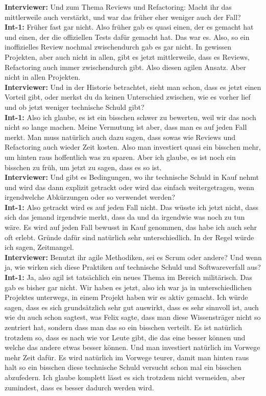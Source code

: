 \textbf{Interviewer:} Und zum Thema Reviews und Refactoring: Macht ihr das mittlerweile auch verstärkt, und war das früher eher weniger auch der Fall?\\
\textbf{Int-1:} Früher fast gar nicht. Also früher gab es quasi einen, der es gemacht hat und einen, der die offiziellen Tests dafür gemacht hat. Das war es. Also, so ein inoffizielles Review nochmal zwischendurch gab es gar nicht. In gewissen Projekten, aber auch nicht in allen, gibt es jetzt mittlerweile, dass es Reviews, Refactoring auch immer zwischendurch gibt. Also diesen agilen Ansatz. Aber nicht in allen Projekten.\\
\textbf{Interviewer:} Und in der Historie betrachtet, sieht man schon, dass es jetzt einen Vorteil gibt, oder merkst du da keinen Unterschied zwischen, wie es vorher lief und ob jetzt weniger technische Schuld gibt?\\
\textbf{Int-1:} Also ich glaube, es ist ein bisschen schwer zu bewerten, weil wir das noch nicht so lange machen. Meine Vermutung ist aber, dass man es auf jeden Fall merkt. Man muss natürlich auch dazu sagen, dass sowas wie Reviews und Refactoring auch wieder Zeit kosten. Also man investiert quasi ein bisschen mehr, um hinten raus hoffentlich was zu sparen. Aber ich glaube, es ist noch ein bisschen zu früh, um jetzt zu sagen, dass es so ist.\\
\textbf{Interviewer:} Und gibt es Bedingungen, wo ihr technische Schuld in Kauf nehmt und wird das dann explizit getrackt oder wird das einfach weitergetragen, wenn irgendwelche Abkürzungen oder so verwendet werden?\\
\textbf{Int-1:} Also getrackt wird es auf jeden Fall nicht. Das wüsste ich jetzt nicht, dass sich das jemand irgendwie merkt, dass da und da irgendwie was noch zu tun wäre. Es wird auf jeden Fall bewusst in Kauf genommen, das habe ich auch sehr oft erlebt. Gründe dafür sind natürlich sehr unterschiedlich. In der Regel würde ich sagen, Zeitmangel.\\
\textbf{Interviewer:} Benutzt ihr agile Methodiken, sei es Scrum oder andere? Und wenn ja, wie wirken sich diese Praktiken auf technische Schuld und Softwareverfall aus?\\
\textbf{Int-1:} Ja, also agil ist tatsächlich ein neues Thema im Bereich militärisch. Das gab es bisher gar nicht. Wir haben es jetzt, also ich war ja in unterschiedlichen Projektes unterwegs, in einem Projekt haben wir es aktiv gemacht. Ich würde sagen, dass es sich grundsätzlich sehr gut auswirkt, dass es sehr sinnvoll ist, auch wie du auch schon sagtest, was Felix sagte, dass man diese Wissensträger nicht so zentriert hat, sondern dass man das so ein bisschen verteilt. Es ist natürlich trotzdem so, dass es nach wie vor Leute gibt, die das eine besser können und welche das andere etwas besser können. Und man investiert natürlich im Vorwege mehr Zeit dafür. Es wird natürlich im Vorwege teurer, damit man hinten raus halt so ein bisschen diese technische Schuld versucht schon mal ein bisschen abzufedern. Ich glaube komplett lässt es sich trotzdem nicht vermeiden, aber zumindest, dass es besser dadurch werden wird.\\
